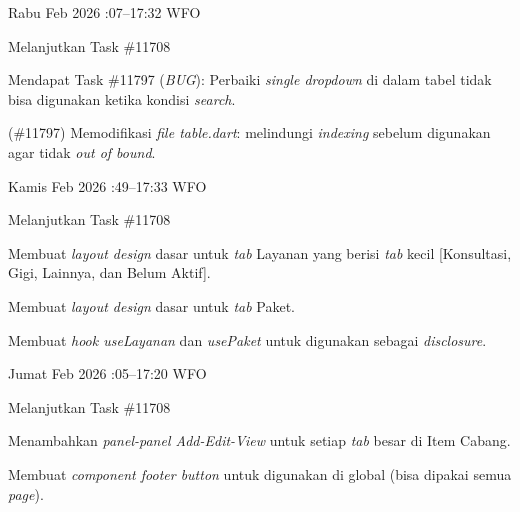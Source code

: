 \begin{logtable}
    {
        Rabu  Feb 2026 :07--17:32 \linebreak
        WFO
    }{
        \begin{loglist}
            \item Melanjutkan Task \#11708
            \item Mendapat Task \#11797 (\textit{BUG}): Perbaiki \textit{single dropdown} di
            dalam tabel tidak bisa digunakan ketika kondisi \textit{search}.
        \end{loglist}
    }{
        \begin{logwork}
            \item (\#11797) Memodifikasi \textit{file table.dart}: melindungi \textit{indexing} sebelum digunakan agar tidak \textit{out of bound}.
        \end{logwork}
    }

    {
        Kamis  Feb 2026 :49--17:33 \linebreak
        WFO
    }{
        \begin{loglist}
            \item Melanjutkan Task \#11708
        \end{loglist}
    }{
        \begin{logwork}
            \item Membuat \textit{layout design} dasar untuk \textit{tab} Layanan yang berisi
            \textit{tab} kecil [Konsultasi, Gigi, Lainnya, dan Belum Aktif].
            \item Membuat \textit{layout design} dasar untuk \textit{tab} Paket.
            \item Membuat \textit{hook useLayanan} dan \textit{usePaket} untuk digunakan sebagai
            \textit{disclosure}.
        \end{logwork}
    }

    {
        Jumat  Feb 2026 :05--17:20 \linebreak
        WFO
    }{
        \begin{loglist}
            \item Melanjutkan Task \#11708
        \end{loglist}
    }{
        \begin{logwork}
            \item Menambahkan \textit{panel-panel Add-Edit-View} untuk setiap \textit{tab} besar
            di Item Cabang.
            \item Membuat \textit{component footer button} untuk digunakan di global (bisa
            dipakai semua \textit{page}).
        \end{logwork}
    }


\end{logtable}

